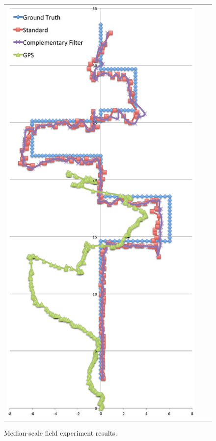\begin{figure}[th!]
\begin{center}
\begin{tabular}[t]{ccc}
\begin{minipage}[t]{0.3\textwidth}
      \includegraphics[width=\textwidth]{fig/median-scale-chart.eps}
      \caption{Median-scale field experiment results.}\label{fg-median-scale-chart}
    \end{minipage}
  \end{tabular}
\end{center}
\end{figure}
